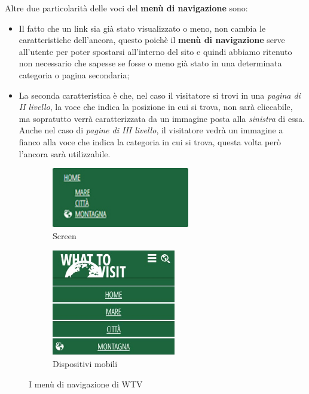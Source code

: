 Altre due particolarità delle voci del \textbf{menù di navigazione} sono:
\begin{itemize}
\item Il fatto che un link sia già stato visualizzato o meno, non cambia le
caratteristiche dell'ancora, questo poichè il \textbf{menù di navigazione}
serve all'utente per poter spostarsi all'interno del sito e quindi abbiamo
ritenuto non necessario che sapesse se fosse o meno già stato in una
determinata categoria o pagina secondaria;
\item La seconda caratteristica è che, nel caso il visitatore si trovi in una
\textit{pagina di II livello}, la voce che indica la posizione in cui si
trova, non sarà cliccabile, ma sopratutto verrà caratterizzata da un immagine
posta alla \textit{sinistra} di essa. Anche nel caso di \textit{pagine di III
livello}, il visitatore vedrà un immagine a fianco alla voce che indica la
categoria in cui si trova, questa volta però l'ancora sarà utilizzabile.
\end{itemize}
\begin{figure}[h!]
        \centering
        \begin{subfigure}[b]{0.3\textwidth}
                \includegraphics[height=2.63cm,width=6cm]{images/pres_nav.jpg}
                \caption{Screen}
                \label{fig:Nav-screen}
        \end{subfigure}
        \hspace{4cm}
        \begin{subfigure}[b]{0.3\textwidth}
                \includegraphics[height=4.65cm,width=5.4cm]{images/pres_nav_m.jpg}
                \caption{Dispositivi mobili}
                \label{fig:Nav-mobile}
        \end{subfigure}
        \caption{I menù di navigazione di WTV}\label{fig:Display-Nav}
\end{figure}

